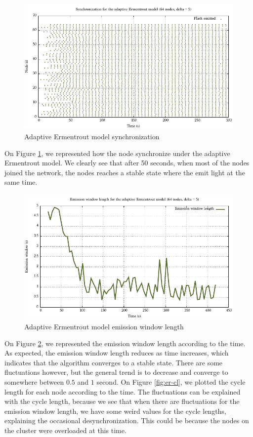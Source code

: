 \documentclass[a4paper, 11pt]{article}
\theoremstyle{plain}
\theoremstyle{definition}
\begin{document}
     \begin{figure}[h]
       \centering
       \includegraphics[width=\textwidth]{../Plots/Firefly-er-64nodes-d5-2.pdf}
       \caption{Adaptive Ermentrout model synchronization}
       \label{fig:er-sync}
     \end{figure}


     On Figure \ref{fig:er-sync}, we represented how the node synchronize under the adaptive Ermentrout
     model. We clearly see that after 50 seconds, when most of the nodes joined the network, the nodes reaches
     a stable state where the emit light at the same time.

     \begin{figure}[h]
       \centering
       \includegraphics[width=\textwidth]{../Plots/Firefly-er-64nodes-d5-2-ewl.pdf}
       \caption{Adaptive Ermentrout model emission window length}
       \label{fig:er-ewl}
     \end{figure}

     On Figure \ref{fig:er-ewl}, we represented the emission window length according to the time. As expected,
     the emission window length reduces as time increases, which indicates that the algorithm converges to a
     stable state. There are some fluctuations however, but the general trend is to decrease and converge to
     somewhere between $0.5$ and $1$ second. On Figure \ref{fig:er-cl}, we plotted the cycle length for each
     node according to the time. The fluctuations can be explained with the cycle length, because we see that
     when there are fluctuations for the emission window length, we have some weird values for the cycle
     lengths, explaining the occasional desynchronization. This could be because the nodes on the cluster were
     overloaded at this time.
\end{document}
